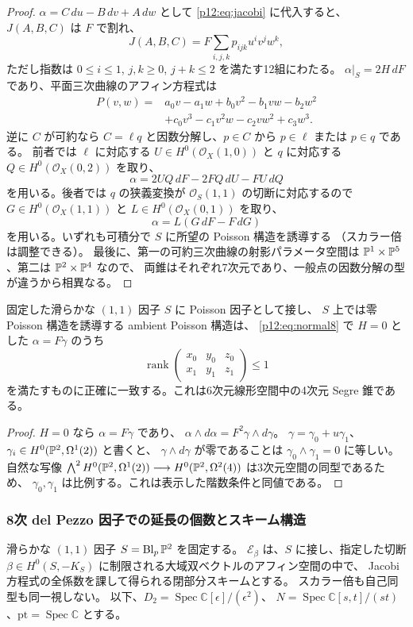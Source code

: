 \begin{proof}
$\alpha=C\,du-B\,dv+A\,dw$ として
\eqref{p12:eq:jacobi} に代入すると、$J(A,B,C)$ は $F$ で割れ、
\[
 J(A,B,C)=F\sum_{i,j,k}p_{ijk}u^iv^jw^k,
\]
ただし指数は $0\le i\le1$, $j,k\ge0$, $j+k\le2$ を満たす12組にわたる。
$\alpha|_S=2H\,dF$ であり、平面三次曲線のアフィン方程式は
\begin{align}\label{p12:eq:cubic8}
P(v,w)={}&a_0v-a_1w+b_0v^2-b_1vw-b_2w^2\nonumber\\
 &+c_0v^3-c_1v^2w-c_2vw^2+c_3w^3.
\end{align}
逆に $C$ が可約なら $C=\ell q$ と因数分解し、$p\in C$ から
$p\in\ell$ または $p\in q$ である。
前者では $\ell$ に対応する $U\in H^0(\mathcal O_X(1,0))$ と
$q$ に対応する $Q\in H^0(\mathcal O_X(0,2))$ を取り、
\[
 \alpha=2UQ\,dF-2FQ\,dU-FU\,dQ
\]
を用いる。後者では $q$ の狭義変換が
$\mathcal O_S(1,1)$ の切断に対応するので
$G\in H^0(\mathcal O_X(1,1))$ と $L\in H^0(\mathcal O_X(0,1))$
を取り、
\[
 \alpha=L(G\,dF-F\,dG)
\]
を用いる。いずれも可積分で $S$ に所望の Poisson 構造を誘導する
（スカラー倍は調整できる）。
最後に、第一の可約三次曲線の射影パラメータ空間は
$\mathbb P^1\times\mathbb P^5$、第二は $\mathbb P^2\times\mathbb P^4$ なので、
両錐はそれぞれ7次元であり、一般点の因数分解の型が違うから相異なる。
\end{proof}

\begin{proposition}\label{p12:prop:zero-restriction}
固定した滑らかな $(1,1)$ 因子 $S$ に Poisson 因子として接し、
$S$ 上では零 Poisson 構造を誘導する ambient Poisson 構造は、
\eqref{p12:eq:normal8} で $H=0$ とした $\alpha=F\gamma$ のうち
\[
\operatorname{rank}\begin{pmatrix}x_0&y_0&z_0\\x_1&y_1&z_1\end{pmatrix}\le1
\]
を満たすものに正確に一致する。これは6次元線形空間中の4次元 Segre 錐である。
\end{proposition}
\begin{proof}
$H=0$ なら $\alpha=F\gamma$ であり、
$\alpha\wedge d\alpha=F^2\gamma\wedge d\gamma$。
$\gamma=\gamma_0+u\gamma_1$、
$\gamma_i\in H^0(\mathbb P^2,\Omega^1(2))$ と書くと、
$\gamma\wedge d\gamma$ が零であることは
$\gamma_0\wedge\gamma_1=0$ に等しい。
自然な写像
$\bigwedge^2H^0(\mathbb P^2,\Omega^1(2))\longrightarrow
H^0(\mathbb P^2,\Omega^2(4))$ は3次元空間の同型であるため、
$\gamma_0,\gamma_1$ は比例する。これは表示した階数条件と同値である。
\end{proof}

\subsubsection{8次 del Pezzo 因子での延長の個数とスキーム構造}
\label{p12:sec:markedfibers}
滑らかな $(1,1)$ 因子 $S=\operatorname{Bl}_p\mathbb P^2$ を固定する。
$\mathcal E_\beta$ は、$S$ に接し、指定した切断
$\beta\in H^0(S,-K_S)$ に制限される大域双ベクトルのアフィン空間の中で、
Jacobi 方程式の全係数を課して得られる閉部分スキームとする。
スカラー倍も自己同型も同一視しない。
以下、$D_2=\operatorname{Spec}\mathbb C[\epsilon]/(\epsilon^2)$、
$N=\operatorname{Spec}\mathbb C[s,t]/(st)$、$\mathrm{pt}=\operatorname{Spec}\mathbb C$ とする。

